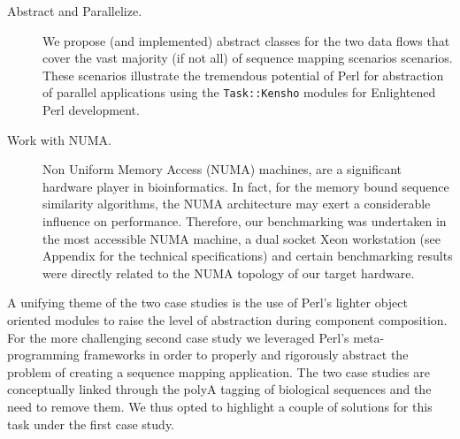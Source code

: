 \documentclass[10pt]{article}
\begin{document}
\begin{description}
\item [Abstract and  Parallelize.] We propose (and implemented) abstract classes for the two data flows that cover the vast majority (if not all) of sequence mapping scenarios scenarios. These scenarios illustrate the tremendous potential of Perl for abstraction of parallel applications using the \texttt{Task::Kensho} modules for Enlightened Perl development.
\item [Work with NUMA.] Non Uniform Memory Access (NUMA) machines, are a significant hardware player in bioinformatics. In fact, for the memory bound sequence similarity algorithms, the NUMA architecture may exert a considerable influence on performance\cite{lopez-villellas_genarchbench_2024}.  Therefore, our benchmarking was undertaken in the most accessible NUMA machine, a dual socket Xeon workstation (see Appendix for the technical specifications) and certain benchmarking results were directly related to the NUMA topology of our target hardware.
\end{description}
A unifying theme of the two case studies is the  use of Perl's lighter object oriented modules to raise the level of abstraction during component composition. For the more challenging second case study we leveraged Perl's meta-programming frameworks in order to properly and rigorously abstract the problem of creating a sequence mapping application. The two case studies are conceptually linked through the polyA tagging of biological sequences and the need to remove them. We thus opted to highlight a couple of solutions for this task under the first case study.
\end{document}
